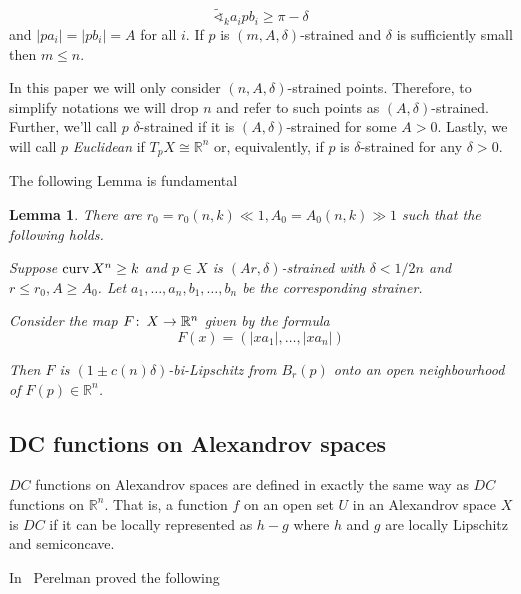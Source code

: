 \documentclass[12pt,leqno,intlimits]{amsart}
\numberwithin{equation}{section}
\newtheorem{lem}[thm]{Lemma}
\theoremstyle{definition}
\theoremstyle{remark}
\newcommand{\R}{\mathbb{R}}
\def\co{\colon\thinspace}
\newcommand{\curv}{\mathop{\rm curv}}
\begin{document}
\[
\tilde\sphericalangle_ka_ipb_i\ge \pi-\delta
\]
and $|pa_i|=|pb_i|=A$ for all $i$. If $p$ is $(m,A,\delta)$-strained and $\delta$ is sufficiently small then $m\le n$.

In this paper we will only consider $(n,A,\delta)$-strained  points. Therefore, to simplify notations we will drop $n$ and refer to such points as $(A,\delta)$-strained. Further, we'll call $p$ $\delta$-strained if it is $(A,\delta)$-strained for some $A>0$. Lastly, we will call $p$ \emph{Euclidean} if $T_pX\cong \R^n$ or, equivalently, if $p$ is $\delta$-strained for any $\delta>0$.

The following Lemma is fundamental

\begin{lem}\label{lem-strainer-map}\cite{BGP}
There are $r_0=r_0(n,k)\ll 1, A_0=A_0(n,k)\gg 1$ such that the following holds.

Suppose $\curv X^n\ge k$ and  $p\in X$ is  $(Ar,\delta)$-strained with $\delta<1/2n$ and  $r\le r_0, A\ge A_0$. Let  $a_1,\ldots, a_n, b_1,\ldots, b_n$ be the corresponding strainer.

Consider the map $F\co X\to\R^n$ given by the formula
\[
F(x)=(|xa_1|,\ldots, |xa_n|)
\]

Then $F$ is $(1\pm c(n) \delta)$-bi-Lipschitz from $B_r(p)$ onto an open neighbourhood of $F(p)\in \R^n$.

\end{lem}










\subsection{DC functions on Alexandrov spaces}
$DC$ functions on Alexandrov spaces are defined in exactly the same way as $DC$ functions on $\R^n$. That is, a function $f$ on an open set $U$ in an Alexandrov space $X$ is $DC$ if  it can be locally represented as  $h-g$ where $h$ and $g$ are locally Lipschitz and semiconcave.

In~\cite{Per-DC} Perelman proved the following
\end{document}
